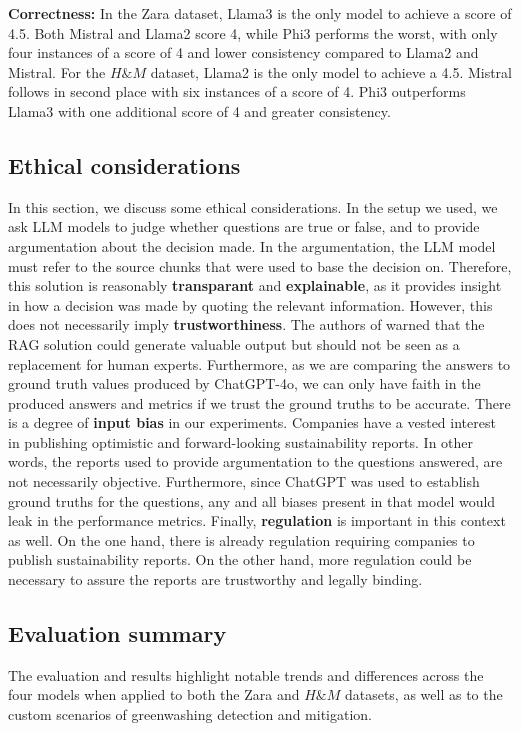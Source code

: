 \documentclass[]{article}
\begin{document}
\textbf{Correctness:}
In the Zara dataset, Llama3 is the only model to achieve a score of 4.5. Both Mistral and Llama2 score 4, while Phi3 performs the worst, with only four instances of a score of 4 and lower consistency compared to Llama2 and Mistral.  
For the $H\&M$ dataset, Llama2 is the only model to achieve a 4.5. Mistral follows in second place with six instances of a score of 4. Phi3 outperforms Llama3 with one additional score of 4 and greater consistency.

\subsection{Ethical considerations}

In this section, we discuss some ethical considerations.
In the setup we used, we ask LLM models to judge whether questions are true or false, and to provide argumentation about the decision made.
In the argumentation, the LLM model must refer to the source chunks that were used to base the decision on.
Therefore, this solution is reasonably \textbf{transparant} and \textbf{explainable}, as it provides insight in how a decision was made by quoting the relevant information.
However, this does not necessarily imply \textbf{trustworthiness}.
The authors of \cite{durability} warned that the RAG solution could generate valuable output but should not be seen as a replacement for human experts.
Furthermore, as we are comparing the answers to ground truth values produced by ChatGPT-4o, we can only have faith in the produced answers and metrics if we trust the ground truths to be accurate.
There is a degree of \textbf{input bias} in our experiments.
Companies have a vested interest in publishing optimistic and forward-looking sustainability reports.
In other words, the reports used to provide argumentation to the questions answered, are not necessarily objective.
Furthermore, since ChatGPT was used to establish ground truths for the questions, any and all biases present in that model would leak in the performance metrics.
Finally, \textbf{regulation} is important in this context as well.
On the one hand, there is already regulation requiring companies to publish sustainability reports.
On the other hand, more regulation could be necessary to assure the reports are trustworthy and legally binding.

\subsection{Evaluation summary}
The evaluation and results highlight notable trends and differences across the four models when applied to both the Zara and $H\&M$ datasets, 
as well as to the custom scenarios of greenwashing detection and mitigation.
\end{document}

